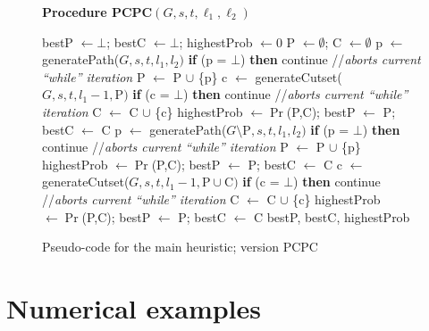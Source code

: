 \documentclass[a4paper]{article}
\newcommand{\ele}{{\ell}}
\begin{document}
\begin{figure}
\textbf{Procedure PCPC$(G, s, t, \ele_1, \ele_2)$}
\begin{center}
\begin{algorithmic}[1]

\STATE bestP $\leftarrow\bot$; bestC $\leftarrow\bot$; highestProb $\leftarrow 0$
	\STATE P $\leftarrow\emptyset$; C $\leftarrow\emptyset$
	\REPEAT
		\STATE p $\leftarrow$ generatePath($G,s,t,l_1,l_2)$
	\STATE \textbf{if} (p = $\bot$) \textbf{then} continue //\emph{aborts current ``while'' iteration}
	\STATE P $\leftarrow$ P $\cup$ \{p\}
	\REPEAT
		\STATE c $\leftarrow$ generateCutset($G,s,t,l_1-1,\text{P})$
	\STATE \textbf{if} (c = $\bot$) \textbf{then} continue //\emph{aborts current ``while'' iteration}
	\STATE C $\leftarrow$ C $\cup$ \{c\}
		\STATE highestProb $\leftarrow \Pr$(P,C); bestP $\leftarrow$ P; bestC $\leftarrow$ C
	\ENDIF
	\REPEAT
		\STATE p $\leftarrow$ generatePath($G\setminus\text{P},s,t,l_1,l_2)$
	\STATE \textbf{if} (p = $\bot$) \textbf{then} continue //\emph{aborts current ``while'' iteration}
	\STATE P $\leftarrow$ P $\cup$ \{p\}
		\STATE highestProb $\leftarrow \Pr$(P,C); bestP $\leftarrow$ P; bestC $\leftarrow$ C
	\ENDIF
	\REPEAT
		\STATE c $\leftarrow$ generateCutset($G,s,t,l_1-1,\text{P} \cup \text{C})$
	\STATE \textbf{if} (c = $\bot$) \textbf{then} continue //\emph{aborts current ``while'' iteration}
	\STATE C $\leftarrow$ C $\cup$ \{c\}
		\STATE highestProb $\leftarrow \Pr$(P,C); bestP $\leftarrow$ P; bestC $\leftarrow$ C
	\ENDIF
\ENDWHILE
\RETURN bestP, bestC, highestProb
\end{algorithmic}
\end{center}
\caption{Pseudo-code for the main heuristic; version PCPC}
\label{algo:mainPathsCuts}
\end{figure}
 


\section{Numerical examples}\label{s:tests}
\end{document}
